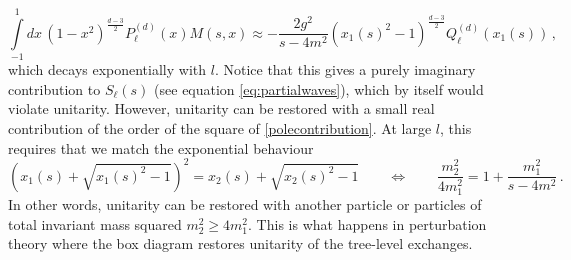 \documentclass[12pt]{article}
\newcommand{\begBvR}[1]{\begin{#1}}
\newcommand{\beq}{\begBvR{equation}}
\newcommand{\eeq}{\end{equation}}
\newcommand{\<}{{\langle}}
\renewcommand{\>}{{\rangle}}
\begin{document}
\beq
\int\limits_{-1}^1\! dx\, (1-x^2)^{\frac{d-3}{2}}P^{(d)}_\ell(x)  M(s, x) \approx -\frac{2g^2}{s-4m^2}(x_1(s)^2-1)^{\frac{d-3}{2}}Q^{(d)}_\ell(x_1(s))\,,
\label{polecontribution}
\eeq 
which decays exponentially with $l$. Notice that this gives a purely imaginary contribution to $S_\ell(s)$ (see equation \eqref{eq:partialwaves}), which by itself would violate unitarity. However, unitarity can be restored with a small real contribution of the order of the square of \eqref{polecontribution}.
At large $l$, this requires that we match the exponential behaviour
\beq
 \left(x_1(s)+\sqrt{x_1(s)^2-1}\right)^2 = x_2(s)+\sqrt{x_2(s)^2-1}  \qquad
\Leftrightarrow \qquad \frac{m_2^2}{4m_1^2} = 1+\frac{ m_1^2}{s-4m^2} \,.
\eeq
In other words, unitarity can be restored with another particle or particles of total invariant mass squared   $m_2^2\ge 4m_1^2$. 
This is what happens in perturbation theory where the box diagram restores unitarity of the tree-level exchanges.
\end{document}
